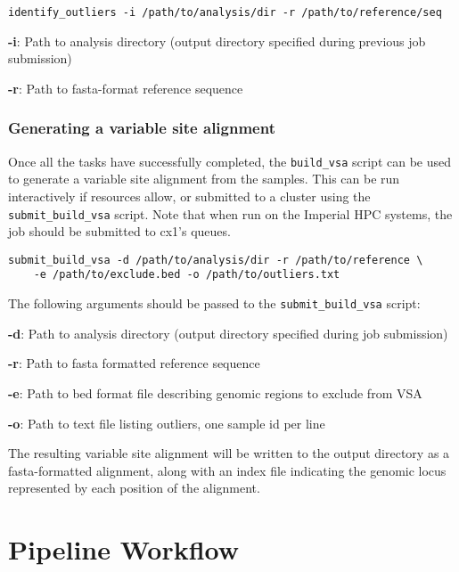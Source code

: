 \documentclass[a4paper,10pt,twoside]{article}
\newenvironment{tight_itemize}{
\begin{itemize}
  \setlength{\itemsep}{0pt}
  \setlength{\parskip}{0pt}
}{\end{itemize}}
\begin{document}
\begin{verbatim}
identify_outliers -i /path/to/analysis/dir -r /path/to/reference/seq
\end{verbatim}

\begin{tight_itemize}
\item \textbf{-i}: Path to analysis directory (output directory specified during previous job submission)
\item \textbf{-r}: Path to fasta-format reference sequence
\end{tight_itemize}

\subsubsection{Generating a variable site alignment}

Once all the tasks have successfully completed, the {\tt build\_vsa} script can
be used to generate a variable site alignment from the samples. This can be run
interactively if resources allow, or submitted to a cluster using the {\tt
submit\_build\_vsa} script. Note that when run on the Imperial HPC systems, the
job should be submitted to cx1's queues.

\begin{Verbatim}
submit_build_vsa -d /path/to/analysis/dir -r /path/to/reference \
	-e /path/to/exclude.bed -o /path/to/outliers.txt
\end{Verbatim}

The following arguments should be passed to the {\tt submit\_build\_vsa} script:

\begin{tight_itemize}
\item \textbf{-d}: Path to analysis directory (output directory specified during job submission)
\item \textbf{-r}: Path to fasta formatted reference sequence
\item \textbf{-e}: Path to bed format file describing genomic regions to exclude from VSA
\item \textbf{-o}: Path to text file listing outliers, one sample id per line
\end{tight_itemize}

The resulting variable site alignment will be written to the output directory
as a fasta-formatted alignment, along with an index file indicating the genomic
locus represented by each position of the alignment.

\section{Pipeline Workflow}
\end{document}
